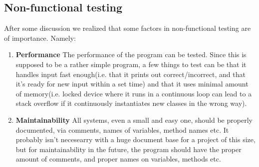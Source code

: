 \documentclass{article}
\begin{document}
{	\subsection{\textbf{Non-functional testing}}
	After some discussion we realized that some factors in non-functional testing
	are of importance. Namely:
	\begin{enumerate}
		\item
		\textbf{Performance}
		The performance of the program can be tested. Since this is supposed to be a rather simple program,
		a few things to test can be that it handles input fast enough(i.e. that it prints out correct/incorrect, and that it's ready
		for new input within a set time) and that it uses minimal amount of memory(i.e. locked device where it runs in a continuous
		loop can lead to a stack overflow if it continuously instantiates new classes in the wrong way).

		\item
		\textbf{Maintainability}
		All systems, even a small and easy one, should be properly documented, via comments, names of variables, method names
		etc. It probably isn't necesearry with a huge document base for a project of this size, but for maintainability in the future,
		the program should have the proper amount of comments, and proper names on variables, methods etc.

	\end{enumerate}
}

\end{document}
